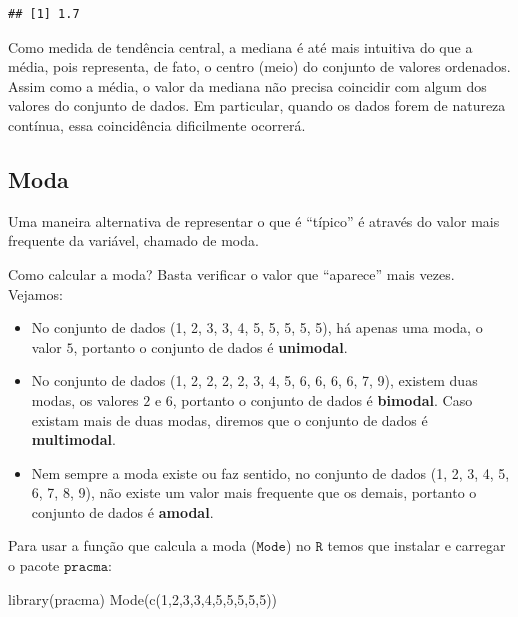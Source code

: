 \documentclass[
]{book}
\newenvironment{Shaded}{\begin{snugshade}}{\end{snugshade}}
\newcommand{\DecValTok}[1]{\textcolor[rgb]{0.00,0.00,0.81}{#1}}
\newcommand{\FunctionTok}[1]{\textcolor[rgb]{0.00,0.00,0.00}{#1}}
\newcommand{\NormalTok}[1]{#1}
\providecommand{\tightlist}{%
  \setlength{\itemsep}{0pt}\setlength{\parskip}{0pt}}
\begin{document}
\begin{verbatim}
## [1] 1.7
\end{verbatim}

Como medida de tendência central, a mediana é até mais intuitiva do que a média, pois representa, de fato, o centro (meio) do conjunto de valores ordenados. Assim como a média, o valor da mediana não precisa coincidir com algum dos valores do conjunto de dados. Em particular, quando os dados forem de natureza contínua, essa coincidência dificilmente ocorrerá.

\hypertarget{moda}{%
\subsection{Moda}\label{moda}}

Uma maneira alternativa de representar o que é ``típico'' é através do valor mais frequente da variável, chamado de moda.

Como calcular a moda? Basta verificar o valor que ``aparece'' mais vezes. Vejamos:

\begin{itemize}
\tightlist
\item
  No conjunto de dados (1, 2, 3, 3, 4, 5, 5, 5, 5, 5), há apenas uma moda, o valor \(5\), portanto o conjunto de dados é \textbf{unimodal}.
\item
  No conjunto de dados (1, 2, 2, 2, 2, 3, 4, 5, 6, 6, 6, 6, 7, 9), existem duas modas, os valores \(2\) e \(6\), portanto o conjunto de dados é \textbf{bimodal}. Caso existam mais de duas modas, diremos que o conjunto de dados é \textbf{multimodal}.
\item
  Nem sempre a moda existe ou faz sentido, no conjunto de dados (1, 2, 3, 4, 5, 6, 7, 8, 9), não existe um valor mais frequente que os demais, portanto o conjunto de dados é \textbf{amodal}.
\end{itemize}

Para usar a função que calcula a moda (\(\texttt{Mode}\)) no \(\texttt{R}\) temos que instalar e carregar o pacote \(\texttt{pracma}\):

\begin{Shaded}
\begin{Highlighting}[]
\FunctionTok{library}\NormalTok{(pracma)}
\FunctionTok{Mode}\NormalTok{(}\FunctionTok{c}\NormalTok{(}\DecValTok{1}\NormalTok{,}\DecValTok{2}\NormalTok{,}\DecValTok{3}\NormalTok{,}\DecValTok{3}\NormalTok{,}\DecValTok{4}\NormalTok{,}\DecValTok{5}\NormalTok{,}\DecValTok{5}\NormalTok{,}\DecValTok{5}\NormalTok{,}\DecValTok{5}\NormalTok{,}\DecValTok{5}\NormalTok{))}
\end{Highlighting}
\end{Shaded}
\end{document}
